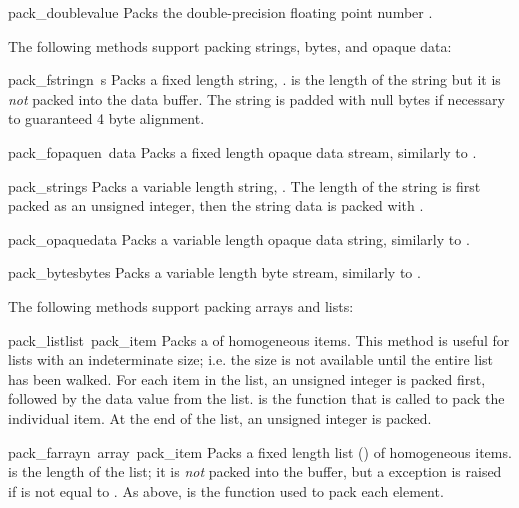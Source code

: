 \begin{funcdesc}{pack_double}{value}
Packs the double-precision floating point number .
\end{funcdesc}

The following methods support packing strings, bytes, and opaque data:

\begin{funcdesc}{pack_fstring}{n\, s}
Packs a fixed length string, .   is the length of the
string but it is \emph{not} packed into the data buffer.  The string
is padded with null bytes if necessary to guaranteed 4 byte alignment.
\end{funcdesc}

\begin{funcdesc}{pack_fopaque}{n\, data}
Packs a fixed length opaque data stream, similarly to
.
\end{funcdesc}

\begin{funcdesc}{pack_string}{s}
Packs a variable length string, .  The length of the string is
first packed as an unsigned integer, then the string data is packed
with .
\end{funcdesc}

\begin{funcdesc}{pack_opaque}{data}
Packs a variable length opaque data string, similarly to
.
\end{funcdesc}

\begin{funcdesc}{pack_bytes}{bytes}
Packs a variable length byte stream, similarly to .
\end{funcdesc}

The following methods support packing arrays and lists:

\begin{funcdesc}{pack_list}{list\, pack_item}
Packs a  of homogeneous items.  This method is useful for
lists with an indeterminate size; i.e. the size is not available until
the entire list has been walked.  For each item in the list, an
unsigned integer  is packed first, followed by the data value
from the list.   is the function that is called to pack
the individual item.  At the end of the list, an unsigned integer
 is packed.
\end{funcdesc}

\begin{funcdesc}{pack_farray}{n\, array\, pack_item}
Packs a fixed length list () of homogeneous items.  
is the length of the list; it is \emph{not} packed into the buffer,
but a  exception is raised if  is not
equal to .  As above,  is the function used to
pack each element.
\end{funcdesc}


